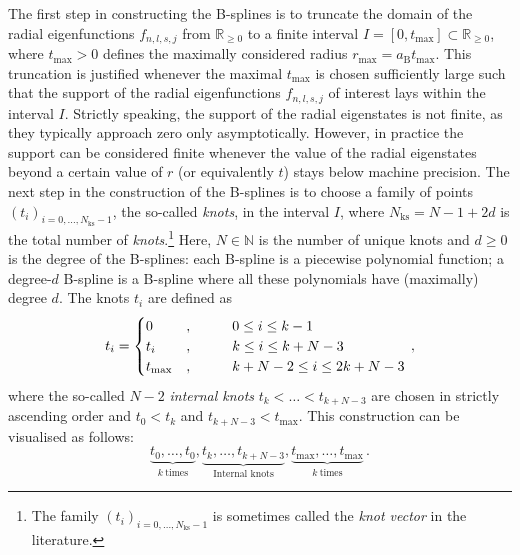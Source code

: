 \documentclass[fontsize=12pt,
               twoside=false,
               BCOR=0mm,
               DIV=14,
               overfullrule=false, %
               toc=bibliography,
               headinclude=true,
               footinclude=false]{scrartcl}
\numberwithin{equation}{section}
\newcommand{\aB}{a_\mathrm{B}}
\begin{document}
    The first step in constructing the B-splines is to truncate the domain of
    the radial eigenfunctions $f_{n,l,s,j}$ from $\mathbb{R}_{\geq0}$ to a
    finite interval $I=[0,t_\mathrm{max}]\subset\mathbb{R}_{\geq0}$, where
    $t_\mathrm{max}>0$ defines the maximally considered radius
    $r_\mathrm{max}=\aB{t}_\mathrm{max}$. This truncation is justified whenever
    the maximal $t_\mathrm{max}$ is chosen sufficiently large such that the
    support of the radial eigenfunctions $f_{n,l,s,j}$ of interest lays within
    the interval $I$. Strictly speaking, the support of the radial eigenstates
    is not finite, as they typically approach zero only asymptotically. However,
    in practice the support can be considered finite whenever the value of the
    radial eigenstates beyond a certain value of $r$ (or equivalently $t$) stays
    below machine precision. The next step in the construction of the B-splines
    is to choose a family of points $(t_i)_{i=0,\dots,N_\mathrm{ks}-1}$, the
    so-called \emph{knots}, in the interval $I$, where $N_\mathrm{ks}=N-1+2d$ is
    the total number of \emph{knots}.\footnote{The family
    $(t_i)_{i=0,\dots,N_\mathrm{ks}-1}$ is sometimes called the \emph{knot
    vector} in the literature.} Here, $N\in\mathbb{N}$ is the number of unique
    knots and $d\geq0$ is the degree of the B-splines: each B-spline is a
    piecewise polynomial function; a degree-$d$ B-spline is a B-spline where all
    these polynomials have (maximally) degree $d$. The knots $t_i$ are defined
    as
    \begin{equation}
        t_i
        =
        \begin{cases}
            0
            &, \hspace*{10mm} 0 \leq i \leq k - 1
        \\
            t_i
            &, \hspace*{10mm} k \leq i \leq k + N - 3
        \\
            t_\mathrm{max}
            &, \hspace*{10mm} k + N - 2 \leq i \leq 2k + N - 3
        \end{cases}
    \,,
    \end{equation}
    where the so-called $N-2$ \emph{internal knots} $t_{k}<\dots<{t}_{k+N-3}$
    are chosen in strictly ascending order and $t_0<t_k$ and
    $t_{k+N-3}<t_\mathrm{max}$. This construction can be visualised as follows:
    \begin{equation}
        \underbrace{t_0, \dots, t_0}_{k \ \text{times}},
        \underbrace{t_k, \dots, t_{k + N -3}}_{\text{Internal knots}},
        \underbrace{t_\mathrm{max}, \dots, t_\mathrm{max}}_{k \ \text{times}}
    \,.
    \end{equation}
\end{document}
